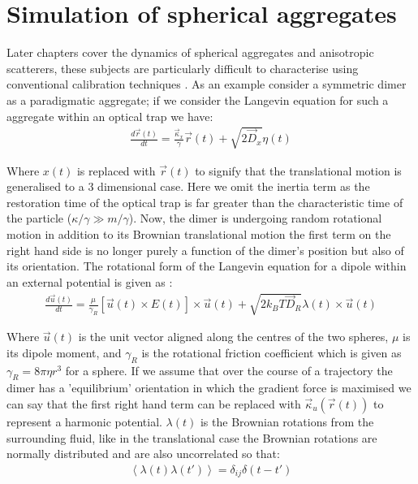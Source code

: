 \section{Simulation of spherical aggregates}
\label{sec:simulations}
Later chapters cover the dynamics of spherical aggregates and anisotropic 
scatterers, these subjects are particularly difficult to characterise 
using conventional calibration techniques \cite{Li2008, Yogesha2011PreciseCO}. 
As an example consider a symmetric dimer as a paradigmatic aggregate; 
if we consider the Langevin equation for such a aggregate within an optical 
trap we have:
\begin{align}
	\frac{{d}\vec{r}(t)}{{dt}} = \frac{\vec{\kappa}_x}{\gamma}\vec{r}(t) + 
	\sqrt{2\vec{D}_x}\eta(t)
\end{align}

Where $x(t)$ is replaced with $\vec{r}(t)$ to signify that the translational 
motion is generalised to a 3 dimensional case. Here we omit the inertia term 
as the restoration time of the optical trap is far greater than the characteristic time of the particle ($\kappa/\gamma \gg m/\gamma$). Now, the dimer is undergoing random rotational motion in addition to its Brownian 
translational motion the first term on the right hand side is no longer 
purely a function of the dimer's position but also of its orientation. 
The rotational form of the Langevin equation for a dipole within an external 
potential is given as \cite{Mazo2008}:
\begin{align}
  \frac{{d}\vec{u}(t)}{{dt}}
  =
  \frac{\mu}{\gamma_R}\left[\vec{u}(t)\times E(t)\right]\times \vec{u}(t)
  + \sqrt{2k_BT\vec{D}_R}\lambda(t)\times \vec{u}(t)
\end{align}

Where $\vec{u}(t)$ is the unit vector aligned along the centres of 
the two spheres, $\mu$ is its dipole moment, and $\gamma_R$ is the 
rotational friction coefficient which is given as $\gamma_R = 8\pi
\eta r^3$ for a sphere. If we assume that over the course of a 
trajectory the dimer has a 'equilibrium' orientation in which the 
gradient force is maximised we can say that the first right hand 
term can be replaced with $\vec{\kappa}_u(\vec{r}(t))$ to represent
a harmonic potential. $\lambda(t)$ is the Brownian rotations from the 
surrounding fluid, like in the translational case the Brownian 
rotations are normally distributed and are also uncorrelated so that:
\begin{align}
  \left<\lambda(t)\lambda(t')\right> = \delta_{ij}\delta(t-t')
\end{align}

